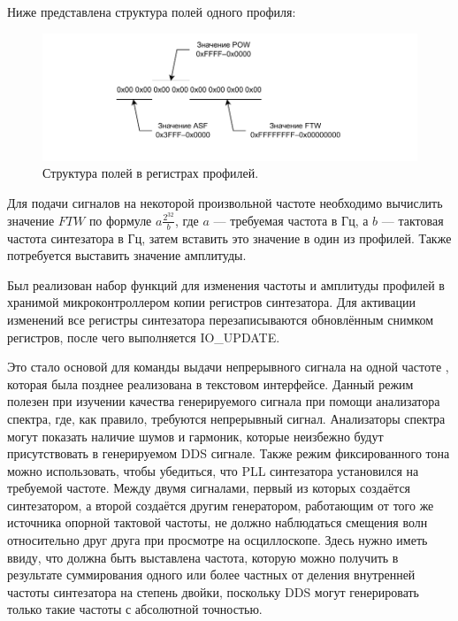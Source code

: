 \documentclass[rusmathsym, eqnumwithinsec, amspack, hyperref]{bomgost}
\begin{document}
Ниже представлена структура полей одного профиля:

%
%
\begin{gostfigure}
\begin{figure}[H]
\centering
\includegraphics{data/single_tone_profile_register_layout.drawio.pdf}
\caption{Структура полей в регистрах профилей.}
\label{fig:single_tone_profile_register_layout}
\end{figure}
\end{gostfigure}

Для подачи сигналов на некоторой произвольной частоте необходимо вычислить значение $FTW$ по формуле $a\frac{2^{32}}{b}$, где $a$ --- требуемая частота в Гц, а $b$ --- тактовая частота синтезатора в Гц, затем вставить это значение в один из профилей. Также потребуется выставить значение амплитуды.

Был реализован набор функций для изменения частоты и амплитуды профилей в хранимой микроконтроллером копии регистров синтезатора. Для активации изменений все регистры синтезатора перезаписываются обновлённым снимком регистров, после чего выполняется IO\_UPDATE.

Это стало основой для команды выдачи непрерывного сигнала на одной частоте {\footnotesize{}}, которая была позднее реализована в текстовом интерфейсе. Данный режим полезен при изучении качества генерируемого сигнала при помощи анализатора спектра, где, как правило, требуются непрерывный сигнал. Анализаторы спектра могут показать наличие шумов и гармоник, которые неизбежно будут присутствовать в генерируемом DDS сигнале. Также режим фиксированного тона можно использовать, чтобы убедиться, что PLL синтезатора установился на требуемой частоте. Между двумя сигналами, первый из которых создаётся синтезатором, а второй создаётся другим генератором, работающим от того же источника опорной тактовой частоты, не должно наблюдаться смещения волн относительно друг друга при просмотре на осциллоскопе. Здесь нужно иметь ввиду, что должна быть выставлена частота, которую можно получить в результате суммирования одного или более частных от деления внутренней частоты синтезатора на степень двойки, поскольку DDS могут генерировать только такие частоты с абсолютной точностью.
\end{document}
